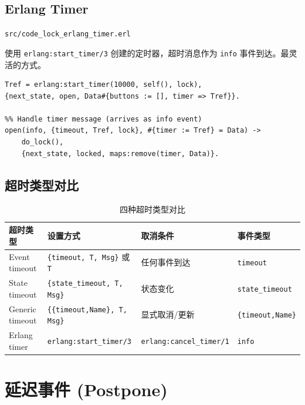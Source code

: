 \documentclass[a4paper,11pt]{article}
\begin{document}
\subsection{Erlang Timer}

\begin{notebox}[源码文件]
\texttt{src/code\_lock\_erlang\_timer.erl}
\end{notebox}

使用 \texttt{erlang:start\_timer/3} 创建的定时器，超时消息作为 \texttt{info} 事件到达。最灵活的方式。

\begin{lstlisting}[style=erlangstyle]
%% Start timer
Tref = erlang:start_timer(10000, self(), lock),
{next_state, open, Data#{buttons := [], timer => Tref}}.

%% Handle timer message (arrives as info event)
open(info, {timeout, Tref, lock}, #{timer := Tref} = Data) ->
    do_lock(),
    {next_state, locked, maps:remove(timer, Data)}.
\end{lstlisting}

\subsection{超时类型对比}

\begin{table}[H]
\centering
\begin{tabular}{@{}llll@{}}
\toprule
\textbf{超时类型} & \textbf{设置方式} & \textbf{取消条件} & \textbf{事件类型} \\
\midrule
Event timeout   & \texttt{\{timeout, T, Msg\}} 或 \texttt{T} & 任何事件到达 & \texttt{timeout} \\
State timeout   & \texttt{\{state\_timeout, T, Msg\}} & 状态变化 & \texttt{state\_timeout} \\
Generic timeout & \texttt{\{\{timeout,Name\}, T, Msg\}} & 显式取消/更新 & \texttt{\{timeout,Name\}} \\
Erlang timer    & \texttt{erlang:start\_timer/3} & \texttt{erlang:cancel\_timer/1} & \texttt{info} \\
\bottomrule
\end{tabular}
\caption{四种超时类型对比}
\end{table}


\section{延迟事件 (Postpone)}
\end{document}
